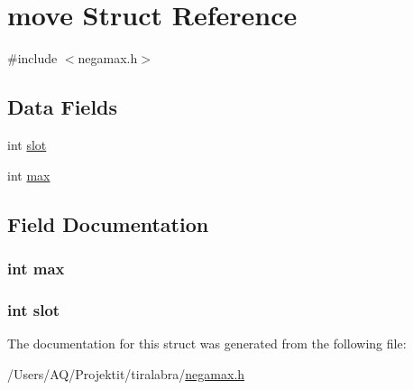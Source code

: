 \hypertarget{structmove}{
\section{move Struct Reference}
\label{structmove}
}


{\ttfamily \#include $<$negamax.h$>$}

\subsection*{Data Fields}
\begin{DoxyCompactItemize}
\item 
int \hyperlink{structmove_a83d6e2127b4cc5e01f2012608487d31a}{slot}
\item 
int \hyperlink{structmove_ae1e1dde676c120fa6d10f3bb2c14059e}{max}
\end{DoxyCompactItemize}


\subsection{Field Documentation}
\hypertarget{structmove_ae1e1dde676c120fa6d10f3bb2c14059e}{
\subsubsection[{max}]{\setlength{\rightskip}{0pt plus 5cm}int {\bf max}}}
\label{structmove_ae1e1dde676c120fa6d10f3bb2c14059e}
\hypertarget{structmove_a83d6e2127b4cc5e01f2012608487d31a}{
\subsubsection[{slot}]{\setlength{\rightskip}{0pt plus 5cm}int {\bf slot}}}
\label{structmove_a83d6e2127b4cc5e01f2012608487d31a}


The documentation for this struct was generated from the following file:\begin{DoxyCompactItemize}
\item 
/Users/AQ/Projektit/tiralabra/\hyperlink{negamax_8h}{negamax.h}\end{DoxyCompactItemize}
